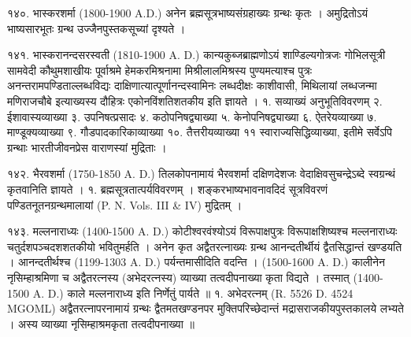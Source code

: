 १४०. भास्करशर्मा (1800-1900 A.D.)
अनेन ब्रह्मसूत्रभाष्यसंग्रहाख्यः ग्रन्थः कृतः । अमुद्रितोऽयं भाष्यसारभूतः ग्रन्थ उज्जैनपुस्तकसूच्यां दृश्यते ।

१४१. भास्करानन्दसरस्वती (1810-1900 A. D.)
कान्यकुब्जब्राह्मणोऽयं शाण्डिल्यगोत्रजः गोभिलसूत्री सामवेदी कौथुमशाखीयः पूर्वाश्रमे हेमकरमिश्रनामा मिश्रीलालमिश्रस्य पुण्यमत्याश्च पुत्रः अनन्तरामपण्डिताल्लब्धविद्यः दाक्षिणात्यात्पूर्णानन्दस्वामिनः लब्धदीक्षः काशीवासी, मिथिलायां लब्धजन्मा मणिराजचौबे इत्याख्यस्य दौहित्रः एकोनविंशतिशतकीय इति ज्ञायते ।
१. सव्याख्यं अनुभूतिविवरणम् २. ईशावास्यव्याख्या ३. उपनिषत्प्रसादः ४. कठोपनिषद्व्याख्या ५. केनोपनिषद्व्याख्या ६. ऐतरेयव्याख्या ७. माण्डूक्यव्याख्या ९. गौडपादकारिकाव्याख्या १०. तैत्तरीयव्याख्या ११ स्वाराज्यसिद्धिव्याख्या, इतीमे सर्वेऽपि ग्रन्थाः भारतीजीवनप्रेस वाराणस्यां मुद्रिताः ।

१४२. भैरवशर्मा (1750-1850 A. D.) 
तिलकोपनामायं भैरवशर्मा दक्षिणदेशजः वेदाक्षिवसुचन्द्रेऽब्दे स्वग्रन्थं कृतवानिति ज्ञायते ।
१. ब्रह्मसूत्रतात्पर्यविवरणम् । शङ्करभाष्यभावनावदिदं सूत्रविवरणं पण्डितनूतनग्रन्थमालायां (P. N. Vols. III & IV) मुद्रितम् ।

१४३. मल्लनाराध्यः (1400-1500 A. D.)
कोटीश्वरवंश्योऽयं विरूपाक्षपुत्रः विरूपाक्षशिष्यश्च मल्लनाराध्यः चतुर्दशपञ्चदशशतकीयो भवितुमर्हति । अनेन कृत अद्वैतरत्नाख्यः ग्रन्थ आनन्दतीर्थीयं द्वैतसिद्धान्तं खण्डयति । आनन्दतीर्थश्च (1199-1303 A. D.) पर्यन्तमासीदिति वदन्ति । (1500-1600 A. D.) कालीनेन नृसिम्हाश्रमिणा च अद्वैतरत्नस्य (अभेदरत्नस्य) व्याख्या तत्वदीपनाख्या कृता विद्यते । तस्मात् (1400-1500 A. D.) काले मल्लनाराध्य इति निर्णेतुं पार्यते ॥
१. अभेदरत्नम् (R. 5526 D. 4524 MGOML)
अद्वैतरत्नापरनामायं ग्रन्थः द्वैतमतखण्डनपर मुक्तिपरिच्छेदान्तं मद्रासराजकीयपुस्तकालये लभ्यते । अस्य व्याख्या नृसिम्हाश्रमकृता तत्वदीपनाख्या ॥

